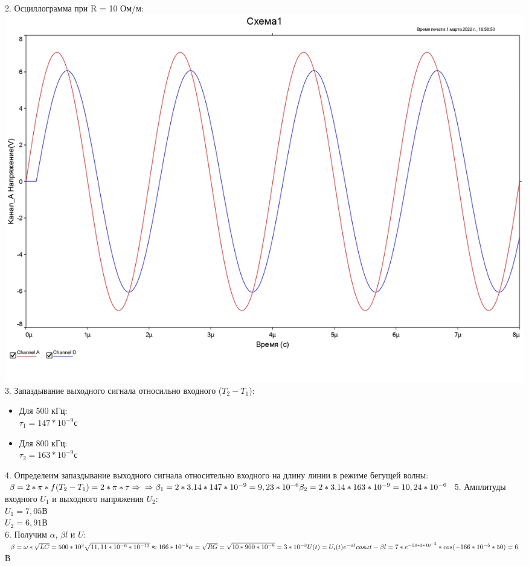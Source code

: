 \documentclass[11pt]{article}
\begin{document}
2. Осциллограмма при R = 10 Ом/м:\\
\includegraphics[width=1\linewidth]{1/10ommosc.jpg}
3. Запаздывание выходного сигнала относильно входного ($T_2-T_1$):
\begin{itemize}
    \item Для 500 кГц: \\$\tau_1 = 147*10^{-9}$с
    \item Для 800 кГц: \\$\tau_2 = 163*10^{-9}$с
\end{itemize}
4. Определеим запаздывание выходного сигнала относительно входного на длину линии в режиме бегущей волны:\\
$\beta = 2*\pi*f(T_2-T_1) = 2*\pi*\tau \Rightarrow \\ 
\Rightarrow \beta_1 = 2 * 3.14 * 147 * 10^{-9} = 9,23 * 10^{-6}\\ 
\beta_2 = 2 * 3.14 * 163 * 10^{-9} = 10,24 * 10^{-6}\\ 
$
5. Амплитуды входного $U_1$ и выходного напряжения $U_2$:\\
$U_1 = 7,05$В\\
$U_2 = 6,91$В\\
6. Получим $\alpha$, $\beta l$ и $U$:\\
$\beta = \omega * \sqrt{LC} = 500 * 10^3\sqrt{11,11*10^{-6}* 10^{-12}} \approx 166* 10^{-5}\\
\alpha = \sqrt{RG} = \sqrt{10 * 900 * 10^{-9}} = 3 * 10^{-3}\\
U(t) = U_i(t)e^{-\alpha l}cos\omega t - \beta l = 7 * e^{-50 * 3 * 10^{-3}} * cos(-166 * 10^{-5} * 50) = 6$В
\end{document}
